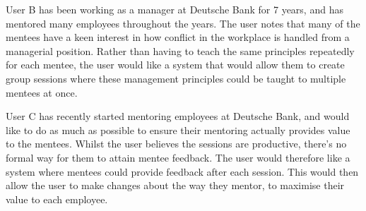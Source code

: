 \documentclass[10pt]{article}
\begin{document}
User B has been working as a manager at Deutsche Bank for 7 years, and has
mentored many employees throughout the years. The user notes that many of the
mentees have a keen interest in how conflict in the workplace is handled from a
managerial position. Rather than having to teach the same principles repeatedly
for each mentee, the user would like a system that would allow them to create
group sessions where these management principles could be taught to multiple
mentees at once.

User C has recently started mentoring employees at Deutsche Bank, and would like
to do as much as possible to ensure their mentoring actually provides value to
the mentees. Whilst the user believes the sessions are productive, there's no
formal way for them to attain mentee feedback. The user would therefore like a
system where mentees could provide feedback after each session. This would then
allow the user to make changes about the way they mentor, to maximise their
value to each employee.
\end{document}
